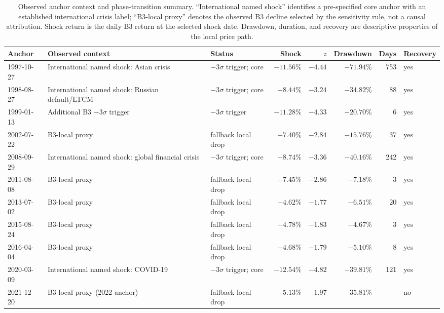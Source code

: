 \begin{table}[width=\textwidth,pos=h]
\centering
\caption{Observed anchor context and phase-transition summary. ``International named shock'' identifies a pre-specified core anchor with an established international crisis label; ``B3-local proxy'' denotes the observed B3 decline selected by the sensitivity rule, not a causal attribution. Shock return is the daily B3 return at the selected shock date. Drawdown, duration, and recovery are descriptive properties of the local price path.}
\label{tab:anchor-context}
\scriptsize
\setlength{\tabcolsep}{3.5pt}
\renewcommand{\arraystretch}{1.10}
\begin{tabular*}{\tblwidth}{@{}lllrrrrl@{}}
\toprule
Anchor & Observed context & Status & Shock & $z$ & Drawdown & Days & Recovery \\
\midrule
1997-10-27 & International named shock: Asian crisis & $-3\sigma$ trigger; core & $-11.56\%$ & $-4.44$ & $-71.94\%$ & 753 & yes \\
1998-08-27 & International named shock: Russian default/LTCM & $-3\sigma$ trigger; core & $-8.44\%$ & $-3.24$ & $-34.82\%$ & 88 & yes \\
1999-01-13 & Additional B3 $-3\sigma$ trigger & $-3\sigma$ trigger & $-11.28\%$ & $-4.33$ & $-20.70\%$ & 6 & yes \\
2002-07-22 & B3-local proxy & fallback local drop & $-7.40\%$ & $-2.84$ & $-15.76\%$ & 37 & yes \\
2008-09-29 & International named shock: global financial crisis & $-3\sigma$ trigger; core & $-8.74\%$ & $-3.36$ & $-40.16\%$ & 242 & yes \\
2011-08-08 & B3-local proxy & fallback local drop & $-7.45\%$ & $-2.86$ & $-7.18\%$ & 3 & yes \\
2013-07-02 & B3-local proxy & fallback local drop & $-4.62\%$ & $-1.77$ & $-6.51\%$ & 20 & yes \\
2015-08-24 & B3-local proxy & fallback local drop & $-4.78\%$ & $-1.83$ & $-4.67\%$ & 3 & yes \\
2016-04-04 & B3-local proxy & fallback local drop & $-4.68\%$ & $-1.79$ & $-5.10\%$ & 8 & yes \\
2020-03-09 & International named shock: COVID-19 & $-3\sigma$ trigger; core & $-12.54\%$ & $-4.82$ & $-39.81\%$ & 121 & yes \\
2021-12-20 & B3-local proxy (2022 anchor) & fallback local drop & $-5.13\%$ & $-1.97$ & $-35.81\%$ & -- & no \\
\bottomrule
\end{tabular*}
\end{table}

